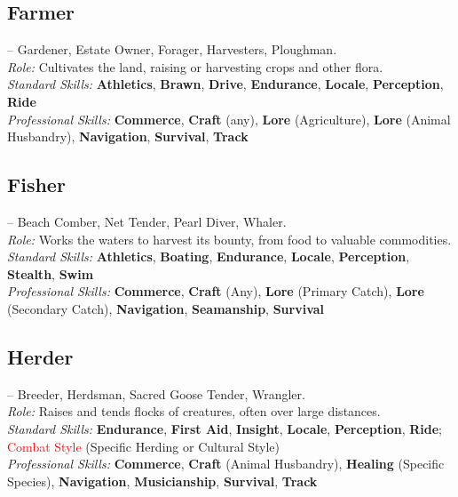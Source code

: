 \documentclass[10pt]{article}
\newcommand{\skill}[1]{\textbf{#1}}
\begin{document}
\vspace{0.2cm}
\subsection*{Farmer}
\label{career:farmer}
 -- Gardener, Estate Owner, Forager, Harvesters, Ploughman.\\
\textit{Role:} Cultivates the land, raising or harvesting crops and other flora.\\
\textit{Standard Skills:} \skill{Athletics}, \skill{Brawn}, \skill{Drive}, \skill{Endurance}, \skill{Locale}, \skill{Perception}, \skill{Ride}\\
\textit{Professional Skills:} \skill{Commerce}, \skill{Craft} (any), \skill{Lore} (Agriculture), \skill{Lore} (Animal Husbandry), \skill{Navigation}, \skill{Survival}, \skill{Track}

\vspace{0.2cm}
\subsection*{Fisher}
\label{career:fisher}
 -- Beach Comber, Net Tender, Pearl Diver, Whaler.\\
\textit{Role:} Works the waters to harvest its bounty, from food to valuable commodities.\\
\textit{Standard Skills:} \skill{Athletics}, \skill{Boating}, \skill{Endurance}, \skill{Locale}, \skill{Perception}, \skill{Stealth}, \skill{Swim}\\
\textit{Professional Skills:} \skill{Commerce}, \skill{Craft} (Any), \skill{Lore} (Primary Catch), \skill{Lore} (Secondary Catch), \skill{Navigation}, \skill{Seamanship}, \skill{Survival}

\vspace{0.2cm}
\subsection*{Herder}
\label{career:herder}
 -- Breeder, Herdsman, Sacred Goose Tender, Wrangler.\\
\textit{Role:} Raises and tends flocks of creatures, often over large distances.\\
\textit{Standard Skills:} \skill{Endurance}, \skill{First Aid}, \skill{Insight}, \skill{Locale}, \skill{Perception}, \skill{Ride}; \textcolor{red}{Combat Style} (Specific Herding or Cultural Style)\\
\textit{Professional Skills:} \skill{Commerce}, \skill{Craft} (Animal Husbandry), \skill{Healing} (Specific Species), \skill{Navigation}, \skill{Musicianship}, \skill{Survival}, \skill{Track}
\end{document}
